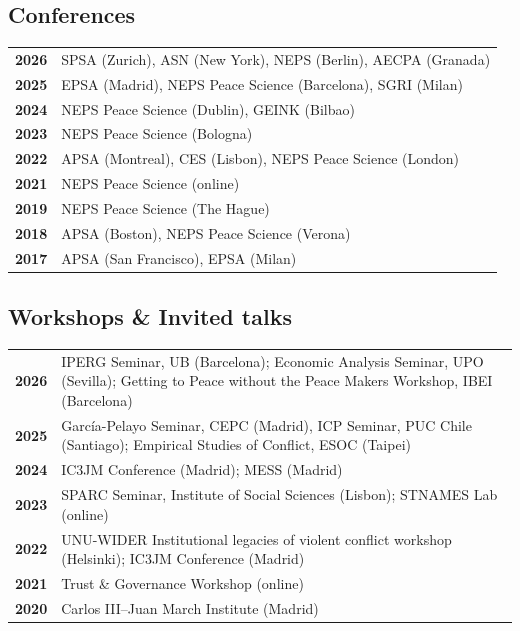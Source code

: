 \documentclass[a4paper, 12pt]{article}
\begin{document}
\subsection*{Conferences}


\begin{tabular}{lp{15cm}}
\textbf{2026} & SPSA (Zurich), ASN (New York), NEPS (Berlin), AECPA (Granada) \\
\textbf{2025} & EPSA (Madrid), NEPS Peace Science (Barcelona), SGRI (Milan) \\
\textbf{2024} & NEPS Peace Science (Dublin), GEINK (Bilbao) \\
\textbf{2023} & NEPS Peace Science (Bologna) \\
\textbf{2022} & APSA (Montreal), CES (Lisbon), NEPS Peace Science (London) \\
\textbf{2021} & NEPS Peace Science (online) \\
\textbf{2019} & NEPS Peace Science (The Hague) \\
\textbf{2018} & APSA (Boston), NEPS Peace Science (Verona) \\
\textbf{2017} & APSA (San Francisco), EPSA (Milan) \\
\end{tabular}



\subsection*{Workshops \& Invited talks}

\begin{tabular}{lp{15cm}}
\textbf{2026} & IPERG Seminar, UB (Barcelona); Economic Analysis Seminar, UPO (Sevilla); Getting to Peace without the Peace Makers Workshop, IBEI (Barcelona) \\
\textbf{2025} & García-Pelayo Seminar, CEPC (Madrid), ICP Seminar, PUC Chile (Santiago); Empirical Studies of Conflict, ESOC (Taipei) \\
\textbf{2024} & IC3JM Conference (Madrid); MESS (Madrid) \\
\textbf{2023} & SPARC Seminar, Institute of Social Sciences (Lisbon); STNAMES Lab (online) \\
\textbf{2022} & UNU-WIDER Institutional legacies of violent conflict workshop (Helsinki); IC3JM Conference (Madrid) \\
\textbf{2021} & Trust \& Governance Workshop (online) \\
\textbf{2020} & Carlos III--Juan March Institute (Madrid) \\
\end{tabular}
\end{document}
